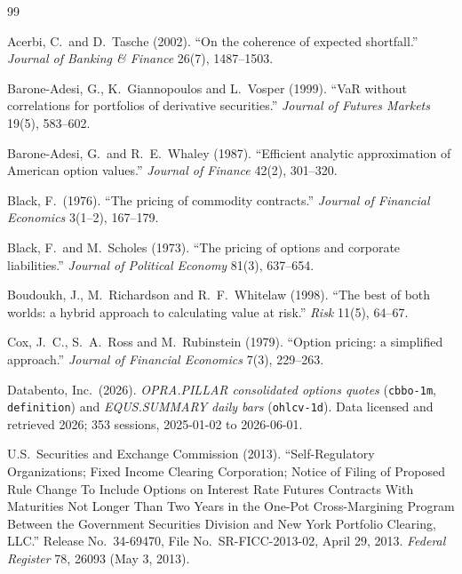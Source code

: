 \documentclass[11pt]{article}
\begin{document}
\begin{thebibliography}{99}
\setlength{\itemsep}{2pt}

Acerbi, C.\ and D.\ Tasche (2002).
``On the coherence of expected shortfall.''
\emph{Journal of Banking \& Finance} 26(7), 1487--1503.

Barone-Adesi, G., K.\ Giannopoulos and L.\ Vosper (1999).
``VaR without correlations for portfolios of derivative securities.''
\emph{Journal of Futures Markets} 19(5), 583--602.

Barone-Adesi, G.\ and R.\ E.\ Whaley (1987).
``Efficient analytic approximation of American option values.''
\emph{Journal of Finance} 42(2), 301--320.

Black, F.\ (1976).
``The pricing of commodity contracts.''
\emph{Journal of Financial Economics} 3(1--2), 167--179.

Black, F.\ and M.\ Scholes (1973).
``The pricing of options and corporate liabilities.''
\emph{Journal of Political Economy} 81(3), 637--654.

Boudoukh, J., M.\ Richardson and R.\ F.\ Whitelaw (1998).
``The best of both worlds: a hybrid approach to calculating value at risk.''
\emph{Risk} 11(5), 64--67.

Cox, J.\ C., S.\ A.\ Ross and M.\ Rubinstein (1979).
``Option pricing: a simplified approach.''
\emph{Journal of Financial Economics} 7(3), 229--263.

Databento, Inc.\ (2026).
\emph{OPRA.PILLAR consolidated options quotes} (\texttt{cbbo-1m}, \texttt{definition})
and \emph{EQUS.SUMMARY daily bars} (\texttt{ohlcv-1d}).
Data licensed and retrieved 2026; 353 sessions, 2025-01-02 to 2026-06-01.

U.S.\ Securities and Exchange Commission (2013).
``Self-Regulatory Organizations; Fixed Income Clearing Corporation; Notice of Filing of
Proposed Rule Change To Include Options on Interest Rate Futures Contracts With
Maturities Not Longer Than Two Years in the One-Pot Cross-Margining Program Between the
Government Securities Division and New York Portfolio Clearing, LLC.''
Release No.\ 34-69470, File No.\ SR-FICC-2013-02, April 29, 2013.
\emph{Federal Register} 78, 26093 (May 3, 2013).


\end{thebibliography}
\end{document}
